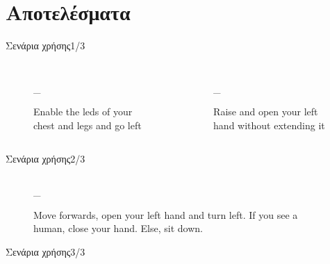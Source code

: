 \documentclass{beamer}
\makeatletter
\newcommand{\escapeunderscore}{\begingroup\@makeother\_\@escapeunderscore}
\newcommand*{\@escapeunderscore}[1]{#1\endgroup}
\makeatother
\begin{document}
{%
\section{Αποτελέσματα}
\begin{frame}{Σενάρια χρήσης\hfill{}1/3}
    \begin{columns}[T]
        \begin{figure}
            \caption{Enable the leds of your chest and legs and go left}
            \begin{adjustbox}{max width=\textwidth}
                \escapeunderscore{}
            \end{adjustbox}
        \end{figure}
        \begin{figure}
            \caption{Raise and open your left hand without extending it}
            \begin{adjustbox}{max width=\textwidth}
                \escapeunderscore{}
            \end{adjustbox}
        \end{figure}
    \end{columns}
\end{frame}
\begin{frame}{Σενάρια χρήσης\hfill{}2/3}
    \begin{figure}
        \begin{columns}[onlytextwidth]
            \caption{Move forwards, open your left hand and turn left.
                If you see a human, close your hand.
                Else, sit down.}
            \begin{adjustbox}{max width=\textwidth, max height=0.9\textheight}
                \escapeunderscore{}
            \end{adjustbox}
        \end{columns}
    \end{figure}
\end{frame}
\begin{frame}{Σενάρια χρήσης\hfill{}3/3}
    \begin{figure}
        \begin{columns}[onlytextwidth]

\end{columns}
\end{figure}
\end{frame}}
\end{document}
